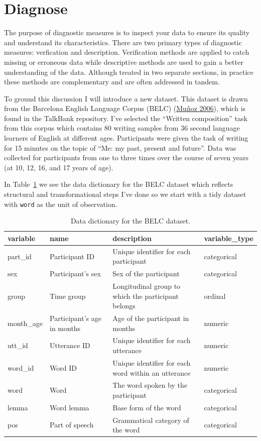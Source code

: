 \documentclass[
  letterpaper,
  DIV=11,
  numbers=noendperiod]{scrreport}
\theoremstyle{definition}
\theoremstyle{remark}
\begin{document}
\hypertarget{sec-aa-diagnose}{%
\section{Diagnose}\label{sec-aa-diagnose}}

The purpose of diagnostic measures is to inspect your data to ensure its
quality and understand its characteristics. There are two primary types
of diagnostic measures: verfication and description. Verification
methods are applied to catch missing or erroneous data while descriptive
methods are used to gain a better understanding of the data. Although
treated in two separate sections, in practice these methods are
complementary and are often addressed in tandem.

To ground this discussion I will introduce a new dataset. This dataset
is drawn from the Barcelona English Language Corpus (BELC)
(\protect\hyperlink{ref-Munoz2006}{Muñoz 2006}), which is found in the
TalkBank repository. I've selected the ``Written composition'' task from
this corpus which contains 80 writing samples from 36 second language
learners of English at different ages. Participants were given the task
of writing for 15 minutes on the topic of ``Me: my past, present and
future''. Data was collected for participants from one to three times
over the course of seven years (at 10, 12, 16, and 17 years of age).

In Table~\ref{tbl-aa-belc-dd} we see the data dictionary for the BELC
dataset which reflects structural and transformational steps I've done
so we start with a tidy dataset with \texttt{word} as the unit of
observation.

\hypertarget{tbl-aa-belc-dd}{}
\begin{table}
\caption{\label{tbl-aa-belc-dd}Data dictionary for the BELC dataset. }\tabularnewline

\centering
\begin{tabular}{l|l|l|l}
\hline
variable & name & description & variable\_type\\
\hline
part\_id & Participant ID & Unique identifier for each participant & categorical\\
\hline
sex & Participant's sex & Sex of the participant & categorical\\
\hline
group & Time group & Longitudinal group to which the participant belongs & ordinal\\
\hline
month\_age & Participant's age in months & Age of the participant in months & numeric\\
\hline
utt\_id & Utterance ID & Unique identifier for each utterance & numeric\\
\hline
word\_id & Word ID & Unique identifier for each word within an utterance & numeric\\
\hline
word & Word & The word spoken by the participant & categorical\\
\hline
lemma & Word lemma & Base form of the word & categorical\\
\hline
pos & Part of speech & Grammatical category of the word & categorical\\
\hline
\end{tabular}
\end{table}
\end{document}
